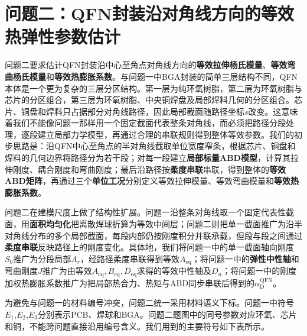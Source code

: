 \documentclass[draft,12pt,a4paper]{ctexart}
\theoremstyle{definition}
\begin{document}

\section{问题二：QFN封装沿对角线方向的\textbf{等效热弹性参数}估计}

问题二要求估计QFN封装沿中心至角点对角线方向的\textbf{等效拉伸杨氏模量}、\textbf{等效弯曲杨氏模量}和\textbf{等效热膨胀系数}。与问题一中BGA封装的简单三层结构不同，QFN本体是一个更为复杂的三层分区结构。第一层为纯环氧树脂，第二层为环氧树脂与芯片的分区组合，第三层为环氧树脂、中央铜焊盘及局部焊料几何的分区组合。芯片、铜盘和焊料只占据部分对角线路径，因此局部截面随路径坐标$s$改变。这意味着我们不能像问题一那样用一个固定截面代表整条对角线，而必须把路径分段处理，逐段建立局部力学模型，再通过合理的串联规则得到整体等效参数。我们的初步思路是：沿QFN中心至角点的半对角线截取单位宽度窄条，根据芯片、铜盘和焊料的几何边界将路径分为若干段；对每一段建立\textbf{局部标量ABD模型}，计算其拉伸刚度、耦合刚度和弯曲刚度；最后沿路径按\textbf{柔度串联}串联，得到整体的\textbf{等效ABD矩阵}，再通过三个\textbf{单位工况}分别定义等效拉伸模量、等效弯曲模量和\textbf{等效热膨胀系数}。




问题二在建模尺度上做了结构性扩展。问题一沿整条对角线取一个固定代表性截面，用\textbf{面积均匀化}把离散焊球折算为等效中间层；问题二则把单一截面推广为沿半对角线分布的多个局部截面，每段内部仍按刚度积分并联承载，但段与段之间通过\textbf{柔度串联}反映路径上的刚度变化。具体地，我们将问题一中的单一截面轴向刚度$S_0$推广为分段局部$A_r$，经路径柔度串联得到等效$A_{\mathrm{eq}}$；将问题一中的\textbf{弹性中性轴}和弯曲刚度$J$推广为由等效$A_{\mathrm{eq}},B_{\mathrm{eq}},D_{\mathrm{eq}}$求得的等效中性轴及$D_n$；将问题一中的刚度加权热膨胀系数推广为把局部热合力、热矩与ABD同步串联后得到的$\alpha_{\mathrm D}^{\mathrm{QFN}}$。


为避免与问题一的材料编号冲突，问题二统一采用材料语义下标。问题一中符号$E_1$,$E_2$,$E_3$分别表示PCB、焊球和BGA。问题二题图中的同号参数对应环氧、芯片和铜，不能跨问题直接沿用编号含义。我们用到的主要符号如下表所示。
\end{document}
